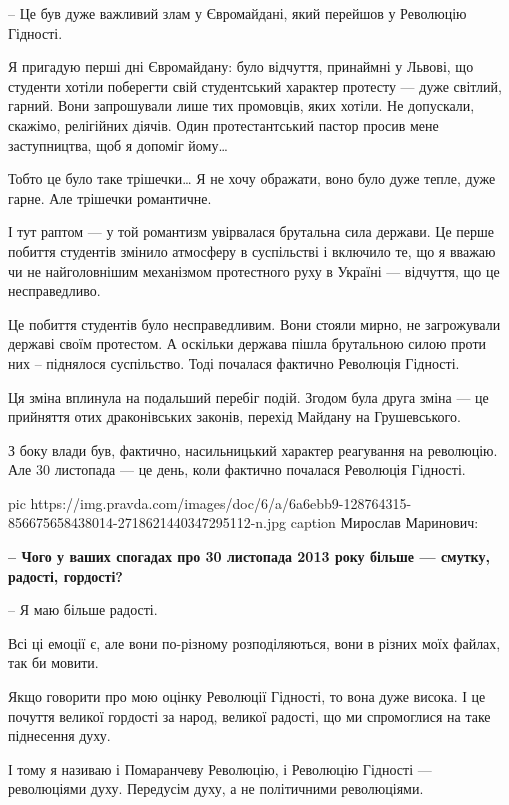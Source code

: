 – Це був дуже важливий злам у Євромайдані, який перейшов у Революцію Гідності.

Я пригадую перші дні Євромайдану: було відчуття, принаймні у Львові, що студенти хотіли поберегти свій студентський характер протесту --- дуже світлий, гарний. Вони запрошували лише тих промовців, яких хотіли. Не допускали, скажімо, релігійних діячів. Один протестантський пастор просив мене заступництва, щоб я допоміг йому… 

Тобто це було таке трішечки… Я не хочу ображати, воно було дуже тепле, дуже гарне. Але трішечки романтичне.

І тут раптом --- у той романтизм увірвалася брутальна сила держави. Це перше
побиття студентів змінило атмосферу в суспільстві і включило те, що я вважаю чи
не найголовнішим механізмом протестного руху в Україні --- відчуття, що це
несправедливо. 

Це побиття студентів було несправедливим. Вони стояли мирно, не загрожували
державі своїм протестом. А оскільки держава пішла брутальною силою проти них –
піднялося суспільство. Тоді почалася фактично Революція Гідності. 

Ця зміна вплинула на подальший перебіг подій. Згодом була друга зміна --- це
прийняття отих драконівських законів, перехід Майдану на Грушевського. 

З боку влади був, фактично, насильницький характер реагування на революцію. Але
30 листопада --- це день, коли фактично почалася Революція Гідності.

\ifcmt
pic https://img.pravda.com/images/doc/6/a/6a6ebb9-128764315-856675658438014-2718621440347295112-n.jpg 
caption Мирослав Маринович: 
\fi

\textbf{– Чого у ваших спогадах про 30 листопада 2013 року більше --- смутку, радості,
гордості?}

– Я маю більше радості. 

Всі ці емоції є, але вони по-різному розподіляються, вони в різних моїх файлах,
так би мовити. 

Якщо говорити про мою оцінку Революції Гідності, то вона дуже висока. І це
почуття великої гордості за народ, великої радості, що ми спромоглися на таке
піднесення духу. 

І тому я називаю і Помаранчеву Революцію, і Революцію Гідності --- революціями
духу. Передусім духу, а не політичними революціями. 

